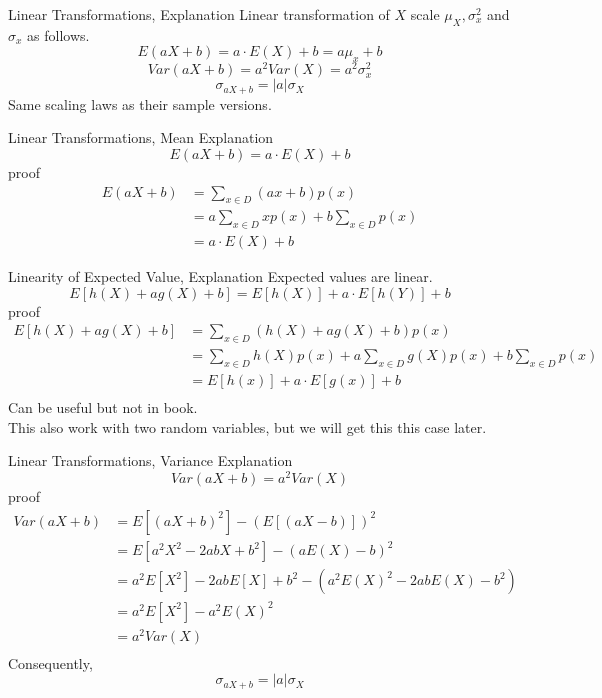 \documentclass[]{beamer}
\newcommand{\nl}[1]{\vspace{#1 em}}
\begin{document}
\begin{frame}{Linear Transformations, Explanation}
    Linear transformation of $X$ scale $\mu_X, \sigma^2_x$ and $\sigma_x$ as follows.
        $$ E(aX + b) = a \cdot E(X) + b = a \mu_x + b$$
        $$ Var(aX + b) = a^2 Var(X) = a^2 \sigma^2_x$$
        $$ \sigma_{aX +b} = |a| \sigma_X$$
    Same scaling laws as their sample versions.
\end{frame}

\begin{frame}{Linear Transformations, Mean Explanation}
    $$ E(aX + b) = a \cdot E(X) + b $$
    proof
    \begin{align*}
        E(aX + b) & = \sum_{x \in D} (a x+ b) p(x) \\
        & = a \sum_{x \in D} x p(x)+  b \sum_{x \in D} p(x) \\
        & = a \cdot E(X) + b
    \end{align*}
\end{frame}

\begin{frame}{Linearity of Expected Value, Explanation}
    Expected values are linear.
    $$ E[h(X) + ag(X) + b] = E[h(X)] + a\cdot E[h(Y)] + b$$
    proof
    \begin{align*}
        E[h(X) + ag(X) + b] & = \sum_{x \in D} (h(X) + ag(X) + b)p(x)\\
        & = \sum_{x \in D} h(X)p(x) + a \sum_{x \in D} g(X) p(x) + b \sum_{x \in D} p(x)\\
        & = E[h(x)] + a\cdot E[g(x)] + b\\
    \end{align*}
    Can be useful but not in book.\\ \nl{0.5}
    This also work with two random variables, but we will get this this case later.
\end{frame}

\begin{frame}{Linear Transformations, Variance Explanation}
    $$ Var(aX + b) = a^2 Var(X) $$
    proof
    \begin{align*}
        Var(aX + b) &= E[(aX + b)^2] - (E[(aX -b)])^2\\
        & =E[a^2 X^2 -2 abX + b^2] - (a E(X) - b)^2\\
        & =a^2 E[X^2] -2 abE[X] + b^2 - (a^2 E(X)^2 -2abE(X) - b^2)\\
        & =a^2 E[X^2] -a^2 E(X)^2 \\
        & = a^2 Var(X)\\
    \end{align*}
    Consequently,
    $$\sigma_{aX+b} = |a|\sigma_X$$
\end{frame}
\end{document}
